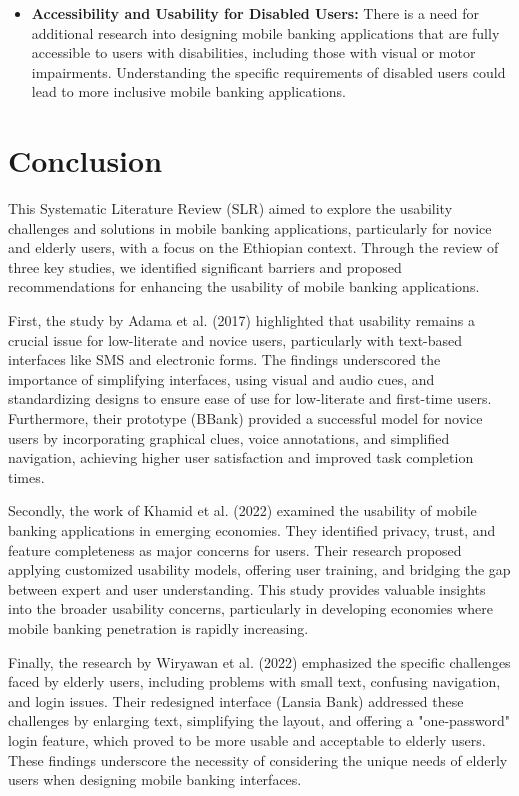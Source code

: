 \documentclass[a4paper,12pt]{report}
\begin{document}
\begin{itemize}
  \item \textbf{Accessibility and Usability for Disabled Users:} There is a need for additional research into designing mobile banking applications that are fully accessible to users with disabilities, including those with visual or motor impairments. Understanding the specific requirements of disabled users could lead to more inclusive mobile banking applications.
\end{itemize}


\section{Conclusion}

This Systematic Literature Review (SLR) aimed to explore the usability challenges and solutions in mobile banking applications, particularly for novice and elderly users, with a focus on the Ethiopian context. Through the review of three key studies, we identified significant barriers and proposed recommendations for enhancing the usability of mobile banking applications.

First, the study by Adama et al. (2017) highlighted that usability remains a crucial issue for low-literate and novice users, particularly with text-based interfaces like SMS and electronic forms. The findings underscored the importance of simplifying interfaces, using visual and audio cues, and standardizing designs to ensure ease of use for low-literate and first-time users. Furthermore, their prototype (BBank) provided a successful model for novice users by incorporating graphical clues, voice annotations, and simplified navigation, achieving higher user satisfaction and improved task completion times.

Secondly, the work of Khamid et al. (2022) examined the usability of mobile banking applications in emerging economies. They identified privacy, trust, and feature completeness as major concerns for users. Their research proposed applying customized usability models, offering user training, and bridging the gap between expert and user understanding. This study provides valuable insights into the broader usability concerns, particularly in developing economies where mobile banking penetration is rapidly increasing.

Finally, the research by Wiryawan et al. (2022) emphasized the specific challenges faced by elderly users, including problems with small text, confusing navigation, and login issues. Their redesigned interface (Lansia Bank) addressed these challenges by enlarging text, simplifying the layout, and offering a "one-password" login feature, which proved to be more usable and acceptable to elderly users. These findings underscore the necessity of considering the unique needs of elderly users when designing mobile banking interfaces.
\end{document}
